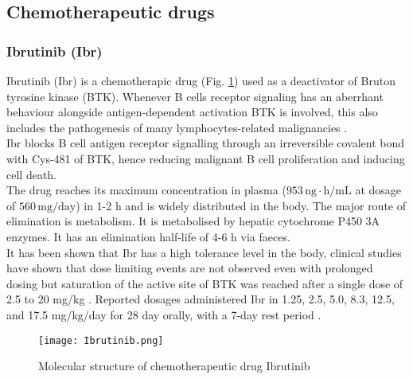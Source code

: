 \subsection{Chemotherapeutic drugs}
\subsubsection{Ibrutinib (Ibr)}
Ibrutinib (Ibr) is a chemotherapic drug (Fig. \ref{fig:Ibr}) used as a deactivator of Bruton tyrosine kinase (BTK). Whenever B cells receptor signaling has an aberrhant behaviour alongside antigen-dependent activation BTK is involved, this also includes the pathogenesis of many lymphocytes-related malignancies \cite{ibr-1}.\\
Ibr blocks B cell antigen receptor signalling through an irreversible covalent bond with Cys-481 of BTK, hence reducing malignant B cell proliferation and inducing cell death.\\
The drug reaches its maximum concentration in plasma ($953\,\text{ng}\cdot\text{h}/\text{mL}$ at dosage of $560\,\text{mg}/\text{day}$) in 1-2 h and is widely distributed in the body. The major route of elimination is metabolism. It is metabolised by hepatic cytochrome P450 3A enzymes. It has an elimination half-life of 4-6 h via faeces.\\
It has been shown that Ibr has a high tolerance level in the body, clinical studies have shown that dose limiting events are not observed even with prolonged dosing \cite{ibr-2} but saturation of the active site of BTK was reached after a single dose of 2.5 to 20 mg/kg \cite{ibr-pubchem}. Reported dosages administered Ibr in 1.25, 2.5, 5.0, 8.3, 12.5, and 17.5 mg/kg/day for 28 day orally, with a 7-day rest period \cite{ibr-2}.
\begin{figure}[htbp!]
	\centering
	\texttt{[image: Ibrutinib.png]}
	\caption{Molecular structure of chemotherapeutic drug Ibrutinib}
	\label{fig:Ibr}
\end{figure}

